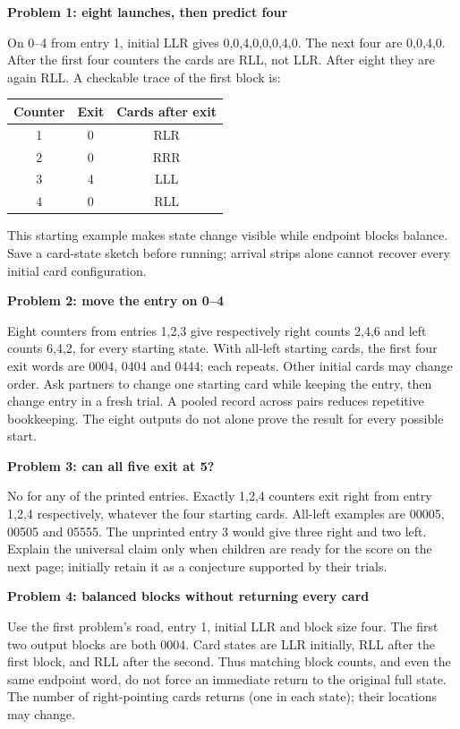\documentclass[11pt]{article}
\newcommand{\prob}[1]{\vspace{3pt}\textbf{#1}\par}
\begin{document}
\prob{Problem 1: eight launches, then predict four}
On 0--4 from entry 1, initial LLR gives 0,0,4,0,0,0,4,0. The next four are 0,0,4,0. After the first four counters the cards are RLL, not LLR. After eight they are again RLL. A checkable trace of the first block is:
\begin{center}\begin{tabular}{ccc}\toprule
Counter & Exit & Cards after exit\\\midrule
1&0&RLR\\2&0&RRR\\3&4&LLL\\4&0&RLL\\\bottomrule\end{tabular}\end{center}
This starting example makes state change visible while endpoint blocks balance. Save a card-state sketch before running; arrival strips alone cannot recover every initial card configuration.

\prob{Problem 2: move the entry on 0--4}
Eight counters from entries 1,2,3 give respectively right counts 2,4,6 and left counts 6,4,2, for every starting state. With all-left starting cards, the first four exit words are 0004, 0404 and 0444; each repeats. Other initial cards may change order. Ask partners to change one starting card while keeping the entry, then change entry in a fresh trial. A pooled record across pairs reduces repetitive bookkeeping. The eight outputs do not alone prove the result for every possible start.

\prob{Problem 3: can all five exit at 5?}
No for any of the printed entries. Exactly 1,2,4 counters exit right from entry 1,2,4 respectively, whatever the four starting cards. All-left examples are 00005, 00505 and 05555. The unprinted entry 3 would give three right and two left. Explain the universal claim only when children are ready for the score on the next page; initially retain it as a conjecture supported by their trials.

\prob{Problem 4: balanced blocks without returning every card}
Use the first problem's road, entry 1, initial LLR and block size four. The first two output blocks are both 0004. Card states are LLR initially, RLL after the first block, and RLL after the second. Thus matching block counts, and even the same endpoint word, do not force an immediate return to the original full state. The number of right-pointing cards returns (one in each state); their locations may change.
\end{document}
